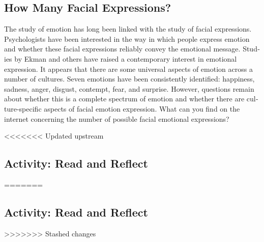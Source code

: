 \documentclass[
]{book}
\begin{document}
\hypertarget{how-many-facial-expressions}{%
\subsection*{How Many Facial Expressions?}\label{how-many-facial-expressions}}

The study of emotion has long been linked with the study of facial expressions. Psychologists have been interested in the way in which people express emotion and whether these facial expressions reliably convey the emotional message. Stud­ies by Ekman and others have raised a contemporary interest in emotional expression. It appears that there are some universal aspects of emotion across a number of cul­tures. Seven emotions have been consistently identified: happi­ness, sadness, anger, disgust, contempt, fear, and surprise. However, questions remain about whether this is a complete spectrum of emotion and whether there are cul­ture-specific aspects of facial emotion expression. What can you find on the internet concerning the number of possible facial emotional expressions?

<<<<<<< Updated upstream
\hypertarget{activity-read-and-reflect-12}{%
\subsection*{Activity: Read and Reflect}\label{activity-read-and-reflect-12}}
=======
\hypertarget{activity-read-and-reflect-11}{%
\subsection*{Activity: Read and Reflect}\label{activity-read-and-reflect-11}}
>>>>>>> Stashed changes
\end{document}
